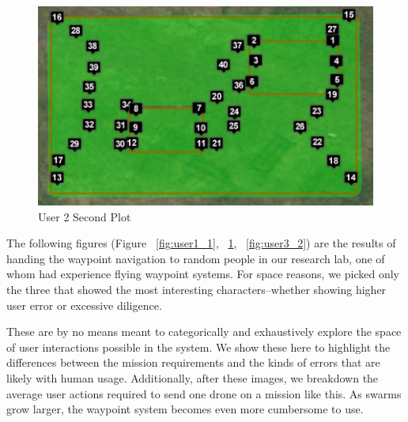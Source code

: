 \documentclass{sig-alternate-ipsn13}
\begin{document}
\fi

\begin{figure}[h]
  \centering
  \includegraphics[scale=0.5]{user_waypoints_4}
  \caption{User 2 Second Plot}
  \label{fig:user2_2}
\end{figure}

The following figures (Figure ~\ref{fig:user1_1}, 
~\ref{fig:user2_2}, ~\ref{fig:user3_2})
are the results of handing the waypoint navigation to random
people in our research lab, one of whom had experience flying waypoint systems.
For space reasons, we picked only the three that showed the most interesting
characters--whether showing higher user error or excessive diligence.

These are by no means meant to categorically and exhaustively explore the space
of user interactions possible in the system. We show these here to highlight the
differences between the mission requirements and the kinds of errors that are likely with
human usage. Additionally, after these images, we breakdown the average user
actions required to send one drone on a mission like this. As swarms grow larger,
the waypoint system becomes even more cumbersome to use.

\end{document}
